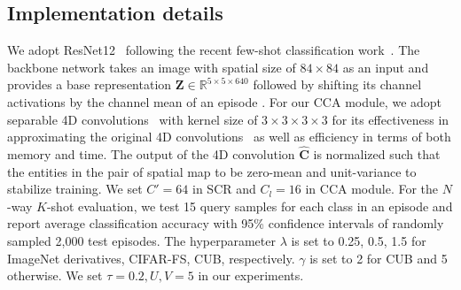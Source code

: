 \documentclass[10pt,twocolumn,letterpaper]{article}
\newcommand{\bC}{\mathbf{C}}
\newcommand{\bZ}{\mathbf{Z}}
\newcommand{\abbself}{SCR\xspace}
\newcommand{\abbcross}{CCA\xspace}
\begin{document}
\subsection{Implementation details}
We adopt ResNet12~\cite{resnet} following the recent few-shot classification work~\cite{shotfree, tadam, feat, deepemd}.
The backbone network takes an image with spatial size of $84 \times 84$ as an input and provides a base representation $\bZ \in \mathbb{R}^{5 \times 5 \times 640}$ followed by shifting its channel activations by the channel mean of an episode \cite{deepemd}.
For our CCA module, we adopt separable 4D convolutions~\cite{vcn} with kernel size of $3 \times 3 \times 3 \times 3$ for its effectiveness in approximating the original 4D convolutions~\cite{ncnet} as well as efficiency in terms of both memory and time.
The output of the 4D convolution $\hat{\bC}$ is normalized such that the entities in the pair of spatial map to be zero-mean and unit-variance to stabilize training.
We set $C'=64$ in \abbself and $C_l=16$ in \abbcross module.
For the $N$-way $K$-shot evaluation, we test 15 query samples for each class in an episode and report average classification accuracy with 95\% confidence intervals of randomly sampled 2,000 test episodes.
The hyperparameter $\lambda$ is set to 0.25, 0.5, 1.5 for ImageNet derivatives, CIFAR-FS, CUB, respectively.
$\gamma$ is set to 2 for CUB and 5 otherwise.
We set $\tau=0.2, U,V=5$ in our experiments.
\end{document}
